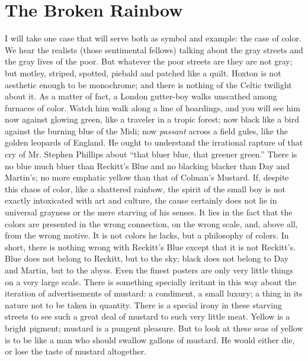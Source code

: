 \documentclass{book}
\begin{document}
\chapter{The Broken Rainbow}
\label{chapter-39}
I will take one case that will serve both as symbol and example: the case of color. We hear the realists (those sentimental fellows) talking about the gray streets and the gray lives of the poor. But whatever the poor streets are they are not gray; but motley, striped, spotted, piebald and patched like a quilt. Hoxton is not aesthetic enough to be monochrome; and there is nothing of the Celtic twilight about it. As a matter of fact, a London gutter-boy walks unscathed among furnaces of color. Watch him walk along a line of hoardings, and you will see him now against glowing green, like a traveler in a tropic forest; now black like a bird against the burning blue of the Midi; now \emph{passant} across a field gules, like the golden leopards of England. He ought to understand the irrational rapture of that cry of Mr. Stephen Phillips about “that bluer blue, that greener green.” There is no blue much bluer than Reckitt’s Blue and no blacking blacker than Day and Martin’s; no more emphatic yellow than that of Colman’s Mustard. If, despite this chaos of color, like a shattered rainbow, the spirit of the small boy is not exactly intoxicated with art and culture, the cause certainly does not lie in universal grayness or the mere starving of his senses. It lies in the fact that the colors are presented in the wrong connection, on the wrong scale, and, above all, from the wrong motive. It is not colors he lacks, but a philosophy of colors. In short, there is nothing wrong with Reckitt’s Blue except that it is not Reckitt’s. Blue does not belong to Reckitt, but to the sky; black does not belong to Day and Martin, but to the abyss. Even the finest posters are only very little things on a very large scale. There is something specially irritant in this way about the iteration of advertisements of mustard: a condiment, a small luxury; a thing in its nature not to be taken in quantity. There is a special irony in these starving streets to see such a great deal of mustard to such very little meat. Yellow is a bright pigment; mustard is a pungent pleasure. But to look at these seas of yellow is to be like a man who should swallow gallons of mustard. He would either die, or lose the taste of mustard altogether.
\end{document}
